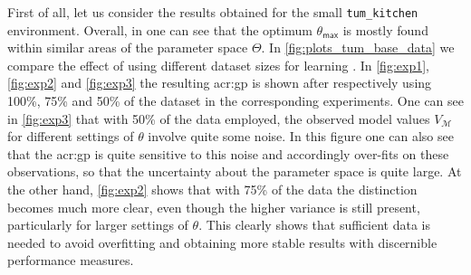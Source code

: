 First of all, let us consider the results obtained for the small \texttt{tum\_kitchen} environment.
Overall, in  one can see that the optimum $\theta_\mathsf{max}$ is mostly found within similar areas of the parameter space $\Theta$.
In \autoref{fig:plots_tum_base_data} we compare the effect of using different dataset sizes for learning .
In \autoref{fig:exp1}, \autoref{fig:exp2} and \autoref{fig:exp3} the resulting \acrshort{acr:gp} is shown after respectively using 100\%, 75\% and 50\% of the dataset in the corresponding experiments.
One can see in \autoref{fig:exp3} that with 50\% of the data employed, the observed model values $V_\mathcal{M}$ for different settings of $\theta$ involve quite some noise.
In this figure one can also see that the \acrshort{acr:gp} is quite sensitive to this noise and accordingly over-fits on these observations, so that the uncertainty about the parameter space is quite large.
At the other hand, \autoref{fig:exp2} shows that with 75\% of the data the distinction becomes much more clear, even though the higher variance is still present, particularly for larger settings of $\theta$.
This clearly shows that sufficient data is needed to avoid overfitting and obtaining more stable results with discernible performance measures.


